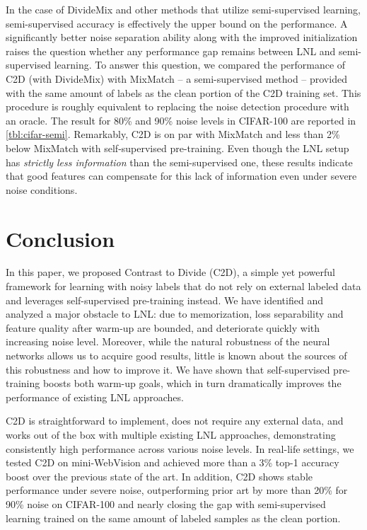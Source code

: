 \documentclass[10pt,twocolumn,letterpaper]{article}
\renewcommand{\cite}[1]{\citep{#1}}
\begin{document}
In the case of DivideMix \cite{li2020dividemix} and other methods that utilize semi-supervised learning, semi-supervised accuracy is effectively the upper bound on the performance.
A significantly better noise separation ability along with the improved initialization raises the question whether any performance gap remains between LNL and semi-supervised learning.  
To answer this question, we compared the performance of C2D (with DivideMix)
with MixMatch -- a semi-supervised method -- provided with the same amount of labels as the clean portion of the C2D training set. This procedure is roughly equivalent to replacing the noise detection procedure with an oracle. The result for 80\% and 90\% noise levels in CIFAR-100 are reported in  \cref{tbl:cifar-semi}.  Remarkably, C2D is on par with MixMatch and less than 2\% below MixMatch with self-supervised pre-training. Even though the LNL setup has \textit{strictly less information} than the semi-supervised one, these results indicate that good features can compensate for this lack of information even under severe noise conditions.
 \section{Conclusion}
\label{sec:conclusion}

In this paper, we proposed Contrast to Divide (C2D), a simple yet powerful framework for learning with noisy labels that do not rely on external labeled data and leverages self-supervised pre-training instead. 
We have identified and analyzed a major obstacle to LNL: due to memorization, loss separability and feature quality after warm-up are bounded, and deteriorate quickly with increasing noise level. 
Moreover, while the natural robustness of the neural networks allows us to acquire good results, little is known about the sources of this robustness and how to improve it. We have shown that self-supervised pre-training boosts both warm-up goals, which in turn dramatically improves the performance of existing LNL approaches. 

C2D is straightforward to implement,  does not require any external data, and works out of the box with multiple existing LNL approaches, demonstrating consistently high performance across various noise levels. In real-life settings, we tested C2D on mini-WebVision and achieved more than a 3\% top-1 accuracy boost over the previous state of the art. In addition, C2D shows stable performance under severe noise,  outperforming prior art by more than 20\% for 90\% noise on CIFAR-100 and nearly closing the gap with semi-supervised learning trained on the same amount of labeled samples as the clean portion. 
\end{document}
